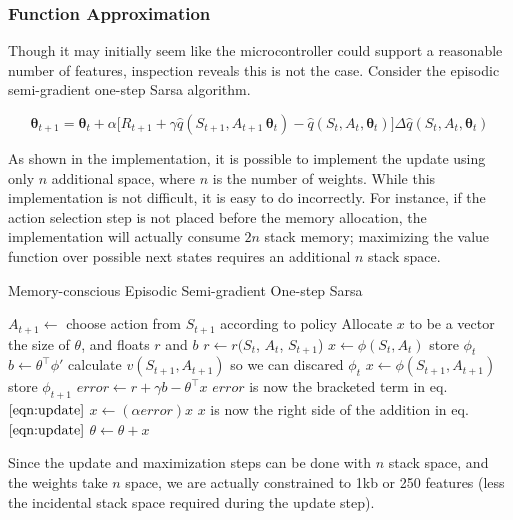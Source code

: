 \documentclass{article}
\begin{document}
	\subsubsection{Function Approximation}
	
	Though it may initially seem like the microcontroller could support a reasonable number of features, inspection reveals this is not the case. Consider the episodic semi-gradient one-step Sarsa algorithm.
	
	\begin{equation}\label{eqn:update}
	\bm{\theta}_{t+1} = \bm{\theta}_t + \alpha \Big[R_{t+1} + \gamma \hat{q}(S_{t+1}, A_{t+1}\, \bm{\theta}_t) - \hat{q}(S_t, A_t, \bm{\theta}_t)\Big]\Delta\hat{q}(S_t, A_t, \bm{\theta}_t)\tag{1}
	\end{equation}

	As shown in the implementation, it is possible to implement the update using only $n$ additional space, where $n$ is the number of weights. While this implementation is not difficult, it is easy to do incorrectly. For instance, if the action selection step is not placed before the memory allocation, the implementation will actually consume $2n$ stack memory; maximizing the value function over possible next states requires an additional $n$ stack space.
	
		\begin{algorithm}
			\caption{Memory-conscious Episodic Semi-gradient One-step Sarsa}
			\label{alg:update}
			\begin{algorithmic}[1] %
				\State $A_{t+1} \gets $ choose action from $S_{t+1}$ according to policy
				\State Allocate $x$ to be a vector the size of $\theta$, and floats $r$ and $b$
				\State $r\gets r(S_t$, $A_t$, $S_{t+1}$)
				\State $x \gets \phi(S_t, A_t)$ \Comment store $\phi_{t}$
				\State $b \gets \theta^\top \phi'$ \Comment calculate $v(S_{t+1},A_{t+1})$ so we can discared $\phi_{t}$
				\State $x \gets \phi(S_{t+1}, A_{t+1})$ \Comment store $\phi_{t+1}$
				\State $error \gets r + \gamma b - \theta^\top x$ \Comment $error$ is now the bracketed term in eq. $\ref{eqn:update}$
				\State $x \gets (\alpha error)x$ \Comment $x$ is now the right side of the addition in eq. $\ref{eqn:update}$
				\State $\theta \gets \theta + x$
				\
				\EndProcedure
			\end{algorithmic}
		\end{algorithm}
	
	Since the update and maximization steps can be done with $n$ stack space, and the weights take $n$ space, we are actually constrained to 1kb or 250 features (less the incidental stack space required during the update step).
	
\end{document}
